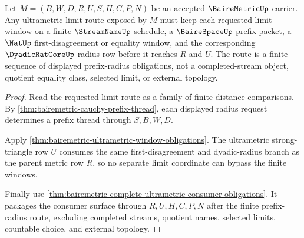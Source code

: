 \begin{theorem}
\label{thm:bairemetric-obligation-ultrametric-limit-route}
Let $M=(B,W,D,R,U,S,H,C,P,N)$ be an accepted $\BaireMetricUp$ carrier. Any ultrametric limit route exposed by $M$ must keep each requested limit window on a finite $\StreamNameUp$ schedule, a $\BaireSpaceUp$ prefix packet, a $\NatUp$ first-disagreement or equality window, and the corresponding $\DyadicRatCoreUp$ radius row before it reaches $R$ and $U$. The route is a finite sequence of displayed prefix-radius obligations, not a completed-stream object, quotient equality class, selected limit, or external topology.
\end{theorem}
\begin{proof}
Read the requested limit route as a family of finite distance comparisons. By \autoref{thm:bairemetric-cauchy-prefix-thread}, each displayed radius request determines a prefix thread through $S,B,W,D$.

Apply \autoref{thm:bairemetric-ultrametric-window-obligations}. The ultrametric strong-triangle row $U$ consumes the same first-disagreement and dyadic-radius branch as the parent metric row $R$, so no separate limit coordinate can bypass the finite windows.

Finally use \autoref{thm:bairemetric-complete-ultrametric-consumer-obligations}. It packages the consumer surface through $R,U,H,C,P,N$ after the finite prefix-radius route, excluding completed streams, quotient names, selected limits, countable choice, and external topology.
\end{proof}

